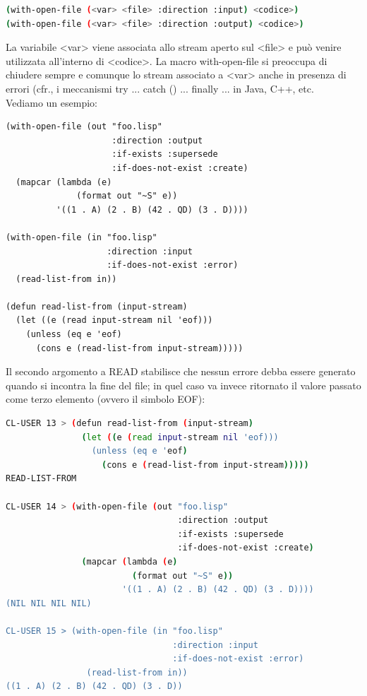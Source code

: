 \documentclass[a4paper,12pt, oneside]{book}
\begin{document}
\begin{shaded}
	\begin{lstlisting}[language=bash]
(with-open-file (<var> <file> :direction :input) <codice>)
(with-open-file (<var> <file> :direction :output) <codice>)
\end{lstlisting}
\end{shaded}
La variabile <var> viene associata allo stream aperto sul <file> e può venire
utilizzata all'interno di <codice>. La macro with-open-file si preoccupa di chiudere sempre e comunque lo
stream associato a <var> anche in presenza di errori (cfr., i meccanismi try
	{...} catch () {...} finally {...} in Java, C++, etc. \\
Vediamo un esempio:
\begin{verbatim}
(with-open-file (out "foo.lisp"
                     :direction :output
                     :if-exists :supersede
                     :if-does-not-exist :create)
  (mapcar (lambda (e)
              (format out "~S" e))
          '((1 . A) (2 . B) (42 . QD) (3 . D))))
          
(with-open-file (in "foo.lisp"
                    :direction :input
                    :if-does-not-exist :error)
  (read-list-from in))
  
(defun read-list-from (input-stream)
  (let ((e (read input-stream nil 'eof)))
    (unless (eq e 'eof)
      (cons e (read-list-from input-stream)))))
\end{verbatim}
Il secondo argomento a READ stabilisce che nessun errore debba essere generato quando
si incontra la fine del file; in quel caso va invece ritornato il valore passato come terzo
elemento (ovvero il simbolo EOF):
\begin{shaded}
	\begin{lstlisting}[language=bash]
CL-USER 13 > (defun read-list-from (input-stream)
               (let ((e (read input-stream nil 'eof)))
                 (unless (eq e 'eof)
                   (cons e (read-list-from input-stream)))))
READ-LIST-FROM

CL-USER 14 > (with-open-file (out "foo.lisp"
                                  :direction :output
                                  :if-exists :supersede
                                  :if-does-not-exist :create)
               (mapcar (lambda (e)
                         (format out "~S" e))
                       '((1 . A) (2 . B) (42 . QD) (3 . D))))
(NIL NIL NIL NIL)

CL-USER 15 > (with-open-file (in "foo.lisp"
                                 :direction :input
                                 :if-does-not-exist :error)
                (read-list-from in))
((1 . A) (2 . B) (42 . QD) (3 . D))
\end{lstlisting}
\end{shaded}
\end{document}
